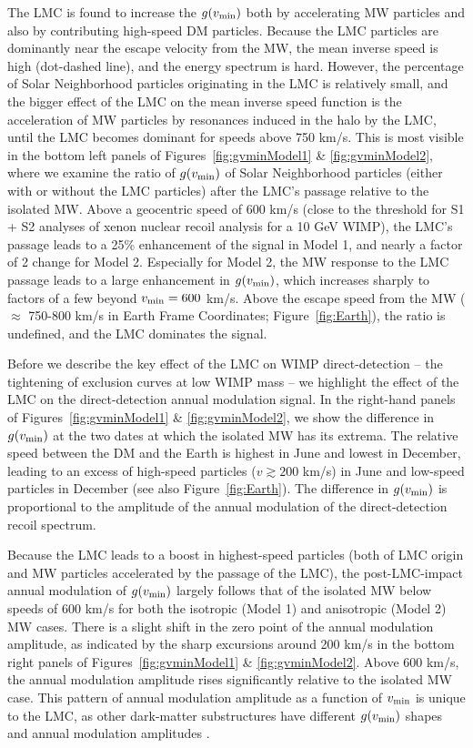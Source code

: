 \documentclass[letterpaper,11pt]{article}
\begin{document}
The LMC is found to increase the 
$g(v_{\rm min})$ both by accelerating MW particles and also by contributing 
high-speed DM particles. Because the LMC particles are dominantly near the escape velocity from the MW, the mean inverse speed is high (dot-dashed line), and the energy spectrum is hard.   However, the percentage of Solar Neighborhood particles originating in the LMC is relatively small, and the bigger effect of the LMC on the mean inverse speed function is the acceleration of MW particles by resonances induced in the halo by the LMC, until the LMC becomes dominant for speeds above 750 km/s.  This is most visible in the bottom left panels of Figures~\ref{fig:gvminModel1} \& \ref{fig:gvminModel2}, where we examine the ratio of $g(v_{\rm min})$ of Solar Neighborhood particles (either with or without the LMC particles) after the LMC's passage relative to the isolated MW.  Above a geocentric speed of 600 km/s (close to the threshold for S1 + S2 analyses of xenon nuclear recoil analysis for a 10 GeV WIMP), the LMC's passage leads to a 25\% enhancement of the signal in Model 1, and nearly a factor of 2 change for Model 2.  Especially for Model 2, the MW response to the LMC passage leads to a large enhancement in $g(v_{\rm min})$, which increases sharply to factors of a few beyond $v_{\rm min} = 600$ km/s.  Above the escape speed from the MW ($\approx$ 750-800 km/s in Earth Frame Coordinates; Figure~\ref{fig:Earth}), the ratio is undefined, and the LMC dominates the signal.

Before we describe the key effect of the LMC on WIMP direct-detection -- the tightening of exclusion curves at low WIMP mass -- we highlight the effect of the LMC on the direct-detection annual modulation signal.  In the right-hand panels of Figures~\ref{fig:gvminModel1} \& \ref{fig:gvminModel2}, we show the difference in $g(v_{\rm min})$ at the two dates at which the isolated MW has its extrema.  The relative speed between the DM and the Earth is highest in June and lowest in December, leading to an excess of high-speed particles ($v \gtrsim 200$ km/s) in June and low-speed particles in December (see also Figure~\ref{fig:Earth}).  The difference in $g(v_{\rm min})$ is proportional to the amplitude of the annual modulation of the direct-detection recoil spectrum. 

Because the LMC leads to a boost in highest-speed particles (both of LMC origin and MW particles accelerated by the passage of the LMC), the post-LMC-impact annual modulation of $g(v_{\rm min})$ largely follows that of the isolated MW below speeds of 600 km/s for both the isotropic (Model 1) and anisotropic (Model 2) MW cases. There is a slight shift in the zero point of the annual modulation amplitude, as indicated by the sharp excursions around 200 km/s in the bottom right panels of Figures~\ref{fig:gvminModel1} \& \ref{fig:gvminModel2}.  Above 600 km/s, the annual modulation amplitude rises significantly relative to the isolated MW case.  This pattern of annual modulation amplitude as a function of $v_{\rm min}$ is unique to the LMC, as other dark-matter substructures have different $g(v_{\rm min})$ shapes and annual modulation amplitudes \cite{Freese:2013}.
\end{document}
